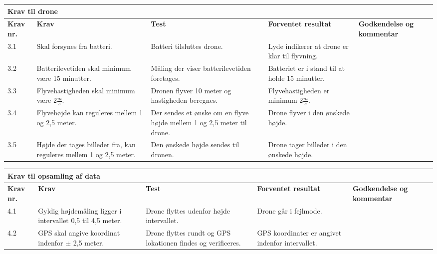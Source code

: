 \begin{sideways}
    \centering
    \begin{tabular}{|l|p{4.5 cm}|p{4.5 cm}|p{4.5 cm}|p{4.5 cm}|p{2 cm}|}
			\hline
			\multicolumn{5}{|l|}{\textbf{Krav til drone}}\\ \hline
			\textbf{Krav nr.} & \textbf{Krav} & \textbf{Test} & \textbf{Forventet \newline resultat} & 			
			\textbf{Godkendelse \newline og kommentar} \\ \hline
			
			3.1 & Skal forsynes fra batteri.
				& Batteri tilsluttes drone.
				& Lyde indikerer at drone er klar til flyvning.
				& \\ \hline

			3.2 & Batterilevetiden skal minimum være 15 minutter.
				& Måling der viser batterilevetiden foretages.
				& Batteriet er i stand til at holde 15 minutter.
				&  \\ \hline
			
			3.3 & Flyvehastigheden skal minimum være 2$\frac{m}{s}$.
				& Dronen flyver 10 meter og hastigheden beregnes.
				& Flyvehastigheden er minimum 2$\frac{m}{s}$.
				& \\ \hline		
				
			3.4 & Flyvehøjde kan reguleres mellem 1 og 2,5 meter.
				& Der sendes et ønske om en flyve højde mellem 1 og 2,5 meter til drone.
				& Drone flyver i den ønskede højde.
				& \\ \hline	
				
			3.5 & Højde der tages billeder fra, kan reguleres mellem 1 og 2,5 meter.
				& Den ønskede højde sendes til dronen.
				& Drone tager billeder i den ønskede højde.
				& \\ \hline	
		\end{tabular}
	\label{tab:krav_1}
\end{sideways}

\begin{sideways}
    \centering
    \begin{tabular}{|l|p{4.5 cm}|p{4.5 cm}|p{4.5 cm}|p{4.5 cm}|p{2 cm}|}
			\hline
			\multicolumn{5}{|l|}{\textbf{Krav til opsamling af data}}\\ \hline
			\textbf{Krav nr.} & \textbf{Krav} & \textbf{Test} & \textbf{Forventet \newline resultat} & 			
			\textbf{Godkendelse \newline og kommentar} \\ \hline
			
			4.1 & Gyldig højdemåling ligger i intervallet 0,5 til 4,5 meter.
				& Drone flyttes udenfor højde intervallet. 
				& Drone går i fejlmode.
				& \\ \hline

			4.2 & GPS skal angive koordinat indenfor $\pm$ 2,5 meter. 
				& Drone flyttes rundt og GPS lokationen findes og verificeres.
				& GPS koordinater er angivet indenfor intervallet. 
				&  \\ \hline		
		\end{tabular}
	\label{tab:krav_1}
\end{sideways}